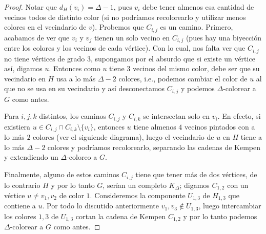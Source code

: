 \documentclass[12pt]{report}
\theoremstyle{plain}
\theoremstyle{definition}
\begin{document}
\begin{proof}

Notar que $d_H (v_i) = \Delta - 1$, pues $v_i$ debe tener almenos esa cantidad de vecinos todos de distinto color (si no podríamos recolorearlo y utilizar menos colores en el vecindario de $v$). Probemos que $C_{i,j}$ es un camino. Primero, acabamos de ver que $v_i$ y $v_j$ tienen un solo vecino en $C_{i,j}$ (pues hay una biyección entre los colores y los vecinos de cada vértice). Con lo cual, nos falta ver que $C_{i,j}$ no tiene vértices de grado $3$, supongamos por el absurdo que si existe un vértice así, digamos $u$. Entonces como $u$ tiene $3$ vecinos del mismo color, debe ser que su vecindario en $H$ usa a lo más $\Delta - 2$ colores, i.e., podemos cambiar el color de $u$ al que no se usa en su vecindario y así desconectamos $C_{i,j}$ y podemos $\Delta$-colorear a $G$ como antes.

Para $i,j,k$ distintos, los caminos $C_{i,j}$ y $C_{i,k}$ se intersectan solo en $v_i$. En efecto, si existiera $u \in C_{i,j} \cap C_{i,k} \setminus \{v_i\}$, entonces $u$ tiene almenos $4$ vecinos pintados con a lo más $2$ colores (ver el siguiende diagrama), luego el vecindario de $u$ en $H$ tiene a lo más $\Delta -2$ colores y podríamos recolorearlo, separando las cadenas de Kempen y extendiendo un $\Delta$-coloreo a $G$.


Finalmente, alguno de estos caminos $C_{i,j}$ tiene que tener más de dos vértices, de lo contrario $H$ y por lo tanto $G$, serían un completo $K_\Delta$; digamos $C_{1,2}$ con un vértice $u \neq v_1,v_2$ de color $1$. Consideremos la componente $U_{1,3}$ de $H_{1,3}$ que contiene a $u$. Por todo lo discutido anteriormente $v_1, v_3 \not \in U_{1,3}$, luego intercambiar los colores $1,3$ de $U_{1,3}$ cortan la cadena de Kempen $C_{1,2}$ y por lo tanto podemos $\Delta$-colorear a $G$ como antes.
\end{proof}








\end{document}
